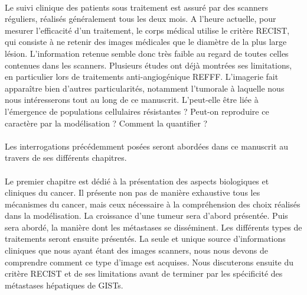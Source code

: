 \documentclass[main.tex]{subfiles}
\begin{document}
\paragraph{}
Le suivi clinique des patients sous traitement est assuré par des scanners réguliers, réalisés généralement tous les deux mois.  
A l'heure actuelle, pour mesurer l'efficacité d'un traitement, le corps médical utilise le critère RECIST, qui consiste à ne retenir des images médicales que le diamètre de la plus large lésion. L'information retenue semble donc très faible au regard de toutes celles contenues dans les scanners. Plusieurs études ont déjà montrées ses limitations, en particulier lors de traitements anti-angiogénique REFFF. L'imagerie fait apparaître bien d'autres particularités, notamment l'\hetero tumorale à laquelle nous nous intéresserons tout au long de ce manuscrit. L'\hetero peut-elle être liée à l'émergence de populations cellulaires résistantes ? Peut-on reproduire ce caractère par la modélisation ? Comment la quantifier ?



\paragraph{}
Les interrogations précédemment posées seront abordées dans ce manuscrit au travers de ses différents chapitres. 

\paragraph{}
Le premier chapitre est dédié à la présentation des aspects biologiques et cliniques du cancer.  Il présente non pas de manière exhaustive tous les mécanismes du cancer, mais ceux nécessaire à la compréhension des choix réalisés dans la modélisation. La croissance d'une tumeur sera d'abord présentée. Puis sera abordé, la manière dont les métastases se disséminent. Les différents types de traitements seront ensuite présentés. La seule et unique source d'informations cliniques que nous ayant étant des images scanners, nous nous devons de comprendre comment ce type d'image est acquises. Nous discuterons ensuite du critère RECIST et de ses limitations avant de terminer par les spécificité des métastases hépatiques de GISTs.
\end{document}
